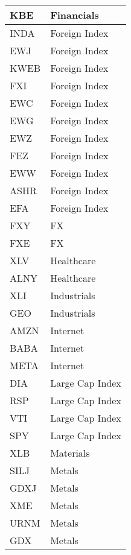 \begin{table}[H]
\begin{tabular}{ll}
        \hline
        KBE & Financials \\
        \hline
        INDA & Foreign Index \\
        \hline
        EWJ & Foreign Index \\
        \hline
        KWEB & Foreign Index \\
        \hline
        FXI & Foreign Index \\
        \hline
        EWC & Foreign Index \\
        \hline
        EWG & Foreign Index \\
        \hline
        EWZ & Foreign Index \\
        \hline
        FEZ & Foreign Index \\
        \hline
        EWW & Foreign Index \\
        \hline
        ASHR & Foreign Index \\
        \hline
        EFA & Foreign Index \\
        \hline
        FXY & FX \\
        \hline
        FXE & FX \\
        \hline
        XLV & Healthcare \\
        \hline
        ALNY & Healthcare \\
        \hline
        XLI & Industrials \\
        \hline
        GEO & Industrials \\
        \hline
        AMZN & Internet \\
        \hline
        BABA & Internet \\
        \hline
        META & Internet \\
        \hline
        DIA & Large Cap Index \\
        \hline
        RSP & Large Cap Index \\
        \hline
        VTI & Large Cap Index \\
        \hline
        SPY & Large Cap Index \\
        \hline
        XLB & Materials \\
        \hline
        SILJ & Metals \\
        \hline
        GDXJ & Metals \\
        \hline
        XME & Metals \\
        \hline
        URNM & Metals \\
        \hline
        GDX & Metals \\
        \hline

\end{tabular}
\end{table}
